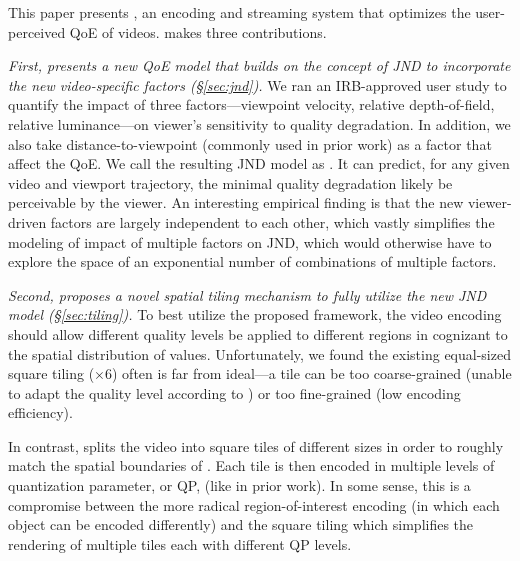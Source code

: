 This paper presents {\em \name}, an encoding and streaming system that optimizes the user-perceived QoE of \vr videos.
\name makes three contributions.

\vspace{0.1cm}
{\em First, \name presents a new QoE model that builds on the concept of JND to incorporate the new \vr video-specific factors (\S\ref{sec:jnd}).}
We ran an IRB-approved user study to quantify the impact of three factors---viewpoint velocity, relative depth-of-field, relative luminance---on viewer's sensitivity to quality degradation. 
In addition, we also take distance-to-viewpoint (commonly used in prior work) as a factor that affect the QoE.
We call the resulting JND model as {\em \vrjnd}. 
It can predict, for any given video and viewport trajectory, the minimal quality degradation likely be perceivable by the viewer.
An interesting empirical finding is that the new viewer-driven factors are largely independent to each other, which vastly simplifies the modeling of impact of multiple factors on JND, which would otherwise have to explore the space of an exponential number of combinations of multiple factors.


\vspace{0.1cm}
{\em Second, \name proposes a novel spatial tiling mechanism to fully utilize the new JND model (\S\ref{sec:tiling}).}
To best utilize the proposed \vrjnd framework, the video encoding should allow different quality levels be applied to different regions in cognizant to the spatial distribution of \vrjnd values.
Unfortunately, we found the existing equal-sized square tiling ($\times$6) often is far from ideal---a tile can be too coarse-grained (\ie unable to adapt the quality level according to \vrjnd) or too fine-grained (\ie low encoding efficiency).

In contrast, \name splits the \vr video into square tiles of different sizes in order to roughly match the spatial boundaries of \vrjnd. 
Each tile is then encoded in multiple levels of quantization parameter, or QP, (like in prior work).
In some sense, this is a compromise between the more radical region-of-interest encoding (in which each object can be encoded differently) and the square tiling which simplifies the rendering of multiple tiles each with different QP levels.



